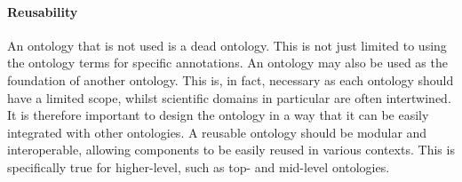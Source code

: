 \paragraph{Reusability}

An ontology that is not used is a dead ontology. This is not just limited to using the ontology terms for specific annotations. An ontology may also be used as the foundation of another ontology. This is, in fact, necessary as each ontology should have a limited scope, whilst scientific domains in particular are often intertwined. It is therefore important to design the ontology in a way that it can be easily integrated with other ontologies. A reusable ontology should be modular and interoperable, allowing components to be easily reused in various contexts. This is specifically true for higher-level, such as top- and mid-level ontologies. 






